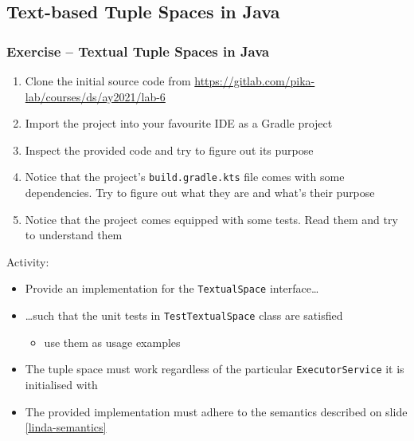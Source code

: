 \documentclass[presentation]{beamer}\mode<presentation>{\usetheme{AMSCesenaPurpleAndGold}}
\newcommand{\labN}{6}
\newcommand{\labGroup}{https://gitlab.com/pika-lab/courses/ds/ay2021}
\newcommand{\labRepo}{\labGroup/lab-\labN}
\begin{document}
\startExercise

\subsection{Text-based Tuple Spaces in Java} 

\begin{frame}[allowframebreaks]
\frametitle{Exercise \currentExercise{} -- Textual Tuple Spaces in Java}

\begin{enumerate}
	\item Clone the initial source code from \url{\labRepo}
	
	\medskip
	
	\item Import the project into your favourite IDE as a Gradle project
	
	\medskip
	
	\item Inspect the provided code and try to figure out its purpose
	
	\medskip
	
	\item Notice that the project's \texttt{build.gradle.kts} file comes with some dependencies.
	Try to figure out what they are and what's their purpose
	
	\medskip
	
	\item Notice that the project comes equipped with some tests. 
	Read them and try to understand them
\end{enumerate}



\framebreak

Activity:
%
\bigskip
%
\begin{itemize}
	
	\item Provide an implementation for the \texttt{TextualSpace} interface\ldots
	
	\bigskip
	
	\item \ldots such that the \alert{unit tests} in \alert{\texttt{TestTextualSpace}} class are satisfied
	\begin{itemize}
		\item use them as usage examples
	\end{itemize}

	\bigskip
	
	\item The tuple space must work regardless of the particular \texttt{ExecutorService} it is initialised with
	
	\bigskip
	
	\item The provided implementation must adhere to the \alert{\linda{} semantics} described on slide \ref{linda-semantics}
	
%	
\end{itemize}
\end{frame}
\end{document}
